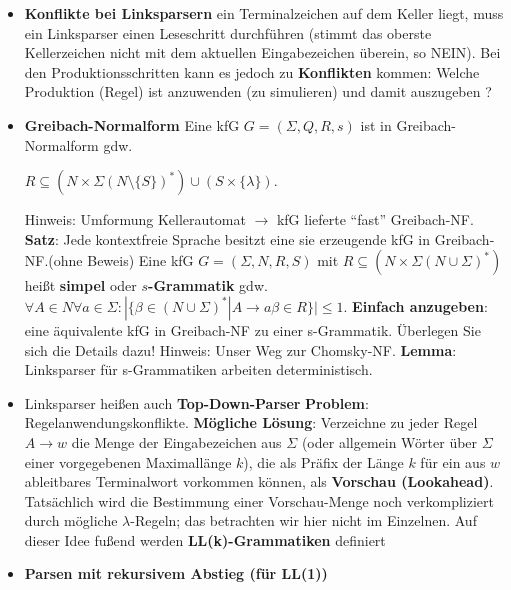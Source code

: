 \documentclass[12pt, a4paper]{article}
\begin{document}
\begin{itemize}
		\item \textbf{Konflikte bei Linksparsern}
			\subitem ein Terminalzeichen auf dem Keller liegt, muss ein Linksparser einen Leseschritt durchführen (stimmt das oberste Kellerzeichen nicht mit dem aktuellen Eingabezeichen überein, so NEIN).
			\subitem Bei den Produktionsschritten kann es jedoch zu \textbf{Konflikten} kommen: Welche Produktion (Regel) ist anzuwenden (zu simulieren) und damit auszugeben ?
		
		\item \textbf{Greibach-Normalform}
			\subitem Eine kfG $G = (\Sigma,Q,R,s)$ ist in Greibach-Normalform gdw.
			\begin{center}
				$R \subseteq (N \times \Sigma(N\setminus \{S\})^{*} ) \cup (S \times \{\lambda\})$.
			\end{center}
			{\small Hinweis: Umformung Kellerautomat $\rightarrow$ kfG lieferte “fast” Greibach-NF.}
			\subitem \textbf{Satz}: Jede kontextfreie Sprache besitzt eine sie erzeugende kfG in Greibach-NF.(ohne Beweis)
			\subitem Eine kfG $G = (\Sigma, N, R, S)$ mit $R \subseteq (N\times\Sigma(N\cup\Sigma)^{*} )$ heißt \textbf{simpel} oder \textbf{$s$-Grammatik} gdw. $\forall A \in N\forall a \in \Sigma : |\{\beta \in (N \cup \Sigma)^{*} | A \rightarrow a\beta \in R\}| \leq 1$.
			\subitem \textbf{Einfach anzugeben}: eine äquivalente kfG in Greibach-NF zu einer s-Grammatik.
			Überlegen Sie sich die Details dazu! Hinweis: Unser Weg zur Chomsky-NF.
			\subitem \textbf{Lemma}: Linksparser für s-Grammatiken arbeiten deterministisch.
			
		\item Linksparser heißen auch \textbf{Top-Down-Parser}
			\subitem \textbf{Problem}: Regelanwendungskonflikte.
			\subitem \textbf{Mögliche Lösung}: Verzeichne zu jeder Regel $A\rightarrow w$ die Menge der Eingabezeichen aus $\Sigma$ (oder allgemein Wörter über $\Sigma$ einer vorgegebenen Maximallänge $k$), die als Präfix der Länge $k$ für ein aus $w$ ableitbares Terminalwort vorkommen können, als \textbf{Vorschau (Lookahead)}.
			\subitem Tatsächlich wird die Bestimmung einer Vorschau-Menge noch verkompliziert durch mögliche $\lambda$-Regeln; das betrachten wir hier nicht im Einzelnen.
			\subitem Auf dieser Idee fußend werden \textbf{LL(k)-Grammatiken} definiert
			
		\item \textbf{Parsen mit rekursivem Abstieg (für LL(1))}
			\begin{itemize}
			

\end{itemize}
\end{itemize}
\end{document}
